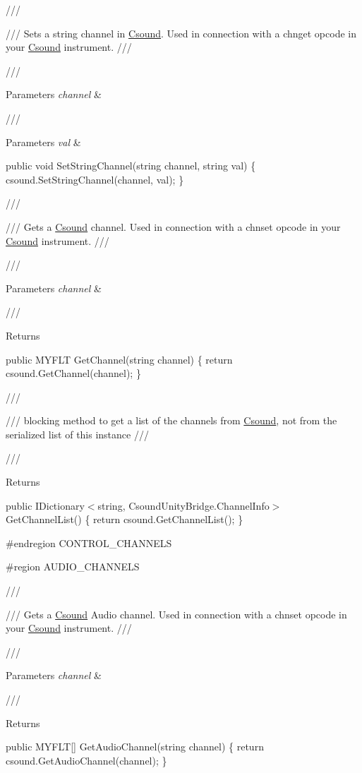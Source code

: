 /// 

/// Sets a string channel in \mbox{\hyperlink{namespace_csound}{Csound}}. Used in connection with a chnget opcode in your \mbox{\hyperlink{namespace_csound}{Csound}} instrument. /// 

/// 
\begin{DoxyParams}{Parameters}
{\em channel} & \\
\hline
\end{DoxyParams}
/// 
\begin{DoxyParams}{Parameters}
{\em val} & \\
\hline
\end{DoxyParams}
public void Set\+String\+Channel(string channel, string val) \{ csound.\+Set\+String\+Channel(channel, val); \}

/// 

/// Gets a \mbox{\hyperlink{namespace_csound}{Csound}} channel. Used in connection with a chnset opcode in your \mbox{\hyperlink{namespace_csound}{Csound}} instrument. /// 

/// 
\begin{DoxyParams}{Parameters}
{\em channel} & \\
\hline
\end{DoxyParams}
/// \begin{DoxyReturn}{Returns}

\end{DoxyReturn}
public MYFLT Get\+Channel(string channel) \{ return csound.\+Get\+Channel(channel); \}

/// 

/// blocking method to get a list of the channels from \mbox{\hyperlink{namespace_csound}{Csound}}, not from the serialized list of this instance /// 

/// \begin{DoxyReturn}{Returns}

\end{DoxyReturn}
public IDictionary$<$string, Csound\+Unity\+Bridge.\+Channel\+Info$>$ Get\+Channel\+List() \{ return csound.\+Get\+Channel\+List(); \}

\#endregion CONTROL\+\_\+\+CHANNELS

\#region AUDIO\+\_\+\+CHANNELS

/// 

/// Gets a \mbox{\hyperlink{namespace_csound}{Csound}} Audio channel. Used in connection with a chnset opcode in your \mbox{\hyperlink{namespace_csound}{Csound}} instrument. /// 

/// 
\begin{DoxyParams}{Parameters}
{\em channel} & \\
\hline
\end{DoxyParams}
/// \begin{DoxyReturn}{Returns}

\end{DoxyReturn}
public MYFLT\mbox{[}\mbox{]} Get\+Audio\+Channel(string channel) \{ return csound.\+Get\+Audio\+Channel(channel); \}

